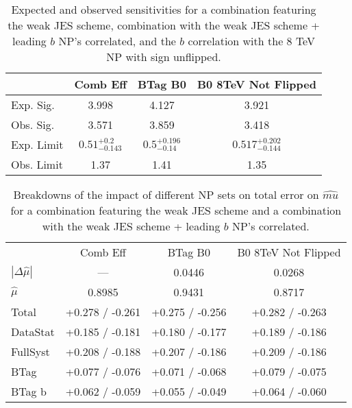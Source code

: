 \begin{table}[htbp]
\begin{center}\begin{tabular}{lccc}
\hline\hline
 & Comb Eff & BTag B0 & B0 8TeV Not Flipped\\
\hline
Exp. Sig. & 3.998 & 4.127 & 3.921\\
Obs. Sig. &  3.571 & 3.859 & 3.418\\ %
\hline
Exp. Limit & $0.51^{+0.2}_{-0.143}$ & $0.5^{+0.196}_{-0.14}$ & $0.517^{+0.202}_{-0.144}$\\
Obs. Limit & 1.37 & 1.41 & 1.35\\
\hline
\end{tabular}
\caption{Expected and observed sensitivities for a combination featuring the weak JES scheme, combination with the weak JES scheme + leading $b$ NP's correlated, and the $b$ correlation with the 8 TeV NP with sign unflipped.}
\label{tab:ExpectedSensitivities:btag-b}
\end{center}
\end{table}

\begin{table}[!htbp]\captionsetup{justification=centering}
\begin{center}\begin{tabular}{lccc}
\hline\hline
 &Comb Eff &BTag B0 &B0 8TeV Not Flipped\\
$\left|\Delta\hat{\mu}\right|$ & --- & 0.0446 & 0.0268\\
$\hat{\mu}$ & 0.8985 & 0.9431 & 0.8717\\
\hline
Total &  +0.278 / -0.261  &  +0.275 / -0.256  &  +0.282 / -0.263 \\
DataStat &  +0.185 / -0.181  &  +0.180 / -0.177  &  +0.189 / -0.186 \\
FullSyst &  +0.208 / -0.188  &  +0.207 / -0.186  &  +0.209 / -0.186 \\
\hline
BTag &  +0.077 / -0.076  &  +0.071 / -0.068  &  +0.079 / -0.075 \\
BTag b &  +0.062 / -0.059  &  +0.055 / -0.049  &  +0.064 / -0.060 \\
\hline
\hline
\end{tabular}
\caption{Breakdowns of the impact of different NP sets on total error on $\hat{mu}$ for a combination featuring the weak JES scheme and a combination with the weak JES scheme + leading $b$ NP's correlated.}
\label{tab:Breakdowns:btag-b}
\end{center}\end{table}


